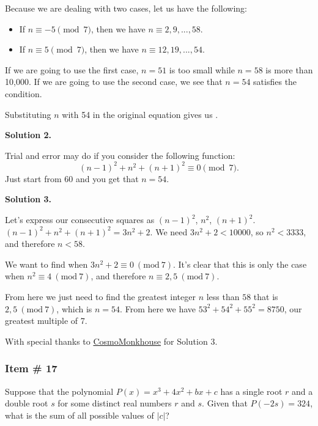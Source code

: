 \documentclass[11pt,paper=letter]{scrartcl}
\newcommand{\soln}[1]{{\sffamily \bfseries Solution #1.}\;}
\newenvironment{rem}%
{\noindent \ignorespaces \small \sffamily  \sansmath {\bfseries \color{DarkMidnightBlue} Remark.}}%
{\ignorespacesafterend}
\begin{document}
Because we are dealing with two cases, let us have the following:

\begin{itemize}
    \item If $n \equiv -5 \pmod{7}$, then we have $n \equiv 2, 9, ... , 58$.
    
    \item If $n \equiv 5 \pmod{7}$, then we have $n \equiv 12,19, ... , 54$.
\end{itemize}

If we are going to use the first case, $n=51$ is too small while $n = 58$ is more than 10,000. If we are going to use the second case, we see that $n = 54$ satisfies the condition.

Substituting $n$ with 54 in the original equation gives us .

\soln2

Trial and error may do if you consider the following function: $$(n-1)^2 + n^2 + (n+1)^2 \equiv 0 \pmod{7}.$$ Just start from $60$ and you get that $n = 54$.

\soln3

Let's express our consecutive squares as $(n-1)^2$, $n^2$, $(n+1)^2$. $(n-1)^2 + n^2 + (n+1)^2 = 3n^2 + 2$. We need $3n^2 + 2 < 10000$, so $n^2 < 3333$, and therefore $n < 58$.

We want to find when $3n^2 + 2 \equiv 0 {\ (\mathrm{mod}\ 7)}$. It's clear that this is only the case when $n^2 \equiv 4 {\ (\mathrm{mod}\ 7)}$, and therefore $n \equiv 2, 5 {\ (\mathrm{mod}\ 7)}$.

From here we just need to find the greatest integer $n$ less than $58$ that is $2, 5 {\ (\mathrm{mod}\ 7)}$, which is $n = 54$. From here we have $53^2 + 54^2 + 55^2 = \boxed{8750}$, our greatest multiple of 7.

\begin{mdframed}
\begin{rem}
With special thanks to \href{https://artofproblemsolving.com/community/user/536265}{CosmoMonkhouse} for Solution 3.
\end{rem}
\end{mdframed}
\subsubsection{Item \# 17}

\begin{probboxed}
Suppose that the polynomial $P(x) = x^3 + 4x^2 + bx +c$ has a single root $r$ and a double root $s$ for some distinct real numbers $r$ and $s$. Given that $P(-2s) = 324$, what is the sum of all possible values of $|c|$?
\end{probboxed}
\end{document}
